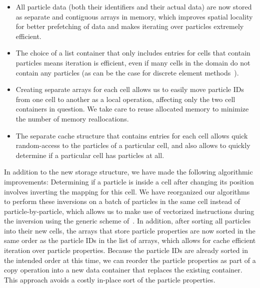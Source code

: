 \documentclass{ansarticle-preprint}
\begin{document}
\begin{itemize}
\item All particle data (both their identifiers and their actual data) are now stored as separate and contiguous arrays in memory, which improves spatial locality for better prefetching of data and makes iterating over particles extremely efficient.
\item The choice of a list container that only includes entries for cells that contain particles means iteration is efficient, even if many cells in the domain do not contain any particles (as can be the case for discrete element methods~\cite{golshan2022lethe}).
\item Creating separate arrays for each cell allows us to easily move particle IDs from one cell to another as a local operation, affecting only the two cell containers in question. We take care to reuse allocated memory to minimize the number of memory reallocations.
\item The separate cache structure that contains entries for each cell allows quick random-access to the particles of a particular cell, and also allows to quickly determine if a particular cell has particles at all.
\end{itemize}

In addition to the new storage structure, we have made the following algorithmic improvements:
Determining if a particle is inside a cell after changing its position involves inverting the mapping for this cell. We have reorganized our algorithms to perform these inversions on a batch of particles in the same cell instead of particle-by-particle, which allows us to make use of vectorized instructions during the inversion using the generic scheme of~\cite{KronbichlerKormann2012}.
In addition, after sorting all particles into their new cells, the arrays that store particle properties are now sorted in the same order as the particle IDs in the list of arrays, which allows for cache efficient iteration over particle properties.
Because the particle IDs are already sorted in the intended order at this time, we can reorder the particle properties as part of a copy operation into a new data container that replaces the existing container. This approach avoids a costly in-place sort of the particle properties.
\end{document}
